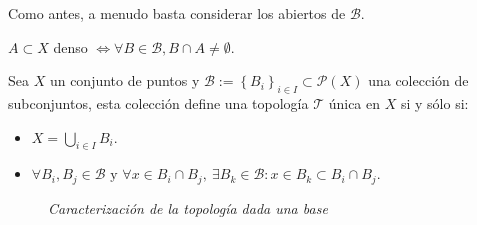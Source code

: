 \begin{pg}
    Como antes, a menudo basta considerar los abiertos de $\mathcal{B}$. 
\end{pg}

\begin{il}
$A \subset X$ denso $\Leftrightarrow \forall B \in \mathcal{B}, B \cap A \neq \emptyset$.
\end{il}

\begin{prop}
Sea $X$ un conjunto de puntos y $\mathcal{B} := \left\{ B_i \right\}_{i \in I} \subset \mathcal{P}\left( X \right)$ una colección de subconjuntos, esta colección define una topología $\mathcal{T}$ única en $X$ si y sólo si: 
\begin{itemize}
    \item $X = \bigcup_{i\in I} B_i$.
    \item $\forall B_i,B_j\in \mathcal{B} \mbox{ y } \forall x \in B_i \cap B_j, \ \exists B_k \in \mathcal{B} : x\in B_k\subset B_i \cap B_j$.
\end{itemize}
\begin{figure}[H]
    \centering
    \caption{\textit{Caracterización de la topología dada una base}}
    \label{fig:caracterización-de-la-topología-dada-una-base}
\end{figure}

\end{prop}
